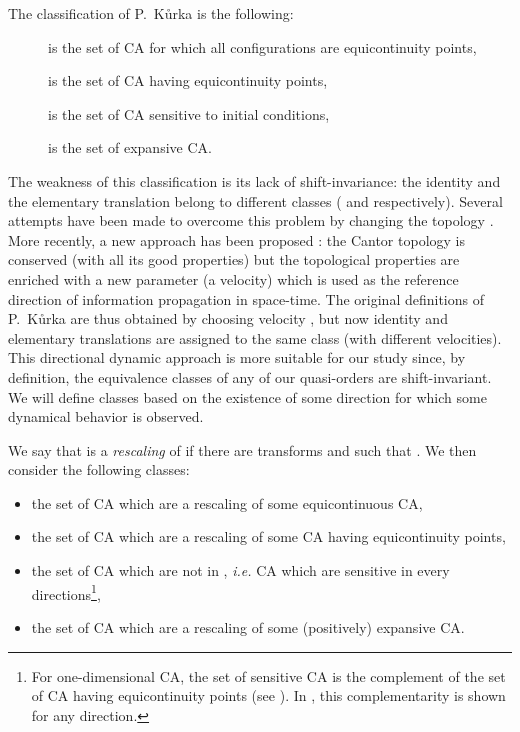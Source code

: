 \documentclass[a4paper]{elsarticle}
\begin{document}
The classification of P.~K{\r u}rka is the following:
\begin{description}
\item[] is the set of CA for which all configurations are equicontinuity points,
\item[] is the set of CA having equicontinuity points,
\item[] is the set of CA sensitive to initial conditions,
\item[] is the set of expansive CA.
\end{description}

The weakness of this classification is its lack of shift-invariance:
the identity and the elementary translation belong to different
classes ( and  respectively). Several attempts have been
made to overcome this problem by changing the topology \cite{besico}.
More recently, a new approach has been proposed \cite{sablikTCS}: the
Cantor topology is conserved (with all its good properties) but the
topological properties are enriched with a new parameter (a velocity)
which is used as the reference direction of information propagation in
space-time. The original definitions of P.~K{\r u}rka are thus
obtained by choosing velocity , but now identity and elementary
translations are assigned to the same class (with different
velocities). This directional dynamic approach is more suitable for
our study since, by definition, the equivalence classes of any of our
quasi-orders are shift-invariant. We will define  classes based on
the existence of some direction for which some dynamical behavior is
observed.

We say that  is a \emph{rescaling} of  if there are
transforms  and  such that
.  We then consider the
following  classes:

\begin{itemize}
\item the set  of CA which are a rescaling of some equicontinuous CA,
\item the set  of CA which are a rescaling of some CA having
  equicontinuity points,
\item the set  of CA which are not in , \textit{i.e.}
  CA which are sensitive in every directions\footnote{For
    one-dimensional CA, the set of sensitive CA is the complement of
    the set of CA having equicontinuity points (see \cite{Kurka97}). In
    \cite{sablikTCS}, this complementarity is shown for any
    direction.},
\item the set  of CA which are a rescaling of some
  (positively) expansive CA.
\end{itemize}
\end{document}
